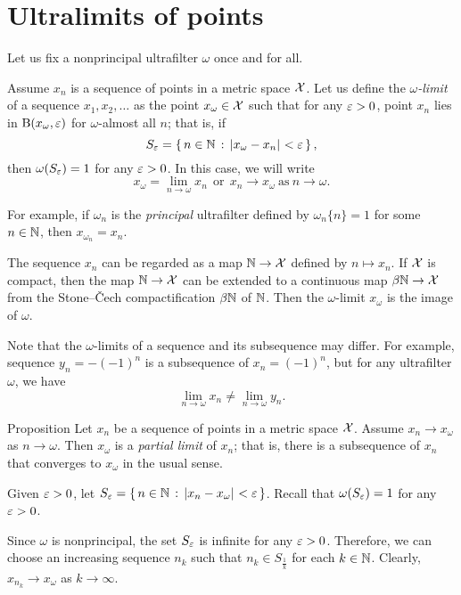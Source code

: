 \section{Ultralimits of points}
\label{ultralimits}

Let us fix a nonprincipal  ultrafilter $\omega$ once and for all.

Assume $x_n$ is a sequence of points in a metric space $\mathcal{X}$. 
Let us define the \emph{$\omega$-limit} of a sequence $x_1,x_2,\dots$ as the point $x_\omega\in\mathcal{X}$ 
such that for any $\varepsilon>0$, point $x_n$ lies in $\mathrm{B}{}(x_\omega,\varepsilon)$ for $\omega$-almost all $n$; 
that is, if 
\[S_\eps=\set{n\in\NN}{\dist{x_\omega}{x_n}{}<\eps},\]
then $\omega(S_\varepsilon)=1$ for any $\varepsilon>0$.
In this case, we will write 
\[x_\omega=\lim_{n\to\omega} x_n
\ \ \text{or}\ \ 
x_n\to x_\omega\ \text{as}\ n\to\omega.\]

For example, if $\omega_n$ is the \textit{principal} ultrafilter defined by $\omega_n\{n\}=1$ for some $n\in\mathbb{N}$, then
$x_{\omega_n}=x_n$.

The sequence $x_n$ can be regarded as a map $\mathbb{N}\to\mathcal{X}$ defined by $n\mapsto x_n$.
If $\mathcal{X}$ is compact, then the map $\mathbb{N}\to\mathcal{X}$ can be extended to a continuous map $\beta\mathbb{N}\to\mathcal{X}$ from the Stone--\v{C}ech compactification $\beta\mathbb{N}$ of $\mathbb{N}$.
Then the $\omega$-limit $x_\omega$ is the image of $\omega$.

Note that the $\omega$-limits of a sequence and its subsequence may differ.
For example, sequence $y_n=-(-1)^n$ is a subsequence of $x_n=(-1)^n$, but for any ultrafilter $\omega$, we have
\[\lim_{n\to\omega}x_n
\ne
\lim_{n\to\omega}y_n.\] 

\begin{thm}{Proposition}\label{prop:ultra/partial}
Let $x_n$ be a sequence of points in a metric space $\mathcal{X}$.
Assume $x_n\to x_\omega$ as $n\to\omega$.
Then $x_\omega$ is a \emph{partial limit} of $x_n$;
that is, there is a subsequence of $x_n$ that converges to $x_\omega$ in the usual sense.
\end{thm}

Given $\varepsilon>0$, 
let $S_\eps=\set{n\in\NN}{\dist{x_n}{x_\omega}{}<\eps}$.
Recall that $\omega(S_\varepsilon)=1$ for any $\varepsilon>0$.

Since $\omega$ is nonprincipal, the set $S_\varepsilon$ is infinite for any $\varepsilon>0$.
Therefore, we can choose an increasing sequence $n_k$
such that $n_k\in S_{\frac1k}$ for each $k\in \mathbb{N}$.
Clearly, $x_{n_k}\to x_\omega$ as $k\to\infty$.
\qeds

